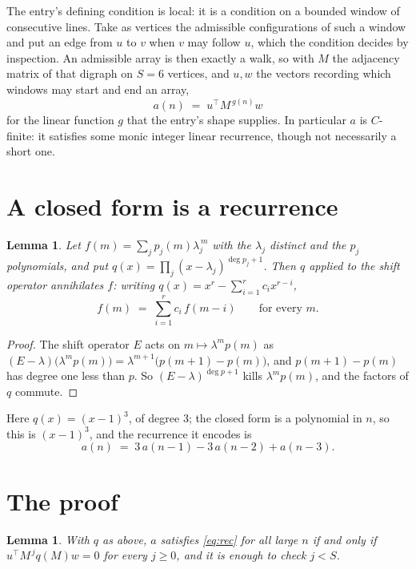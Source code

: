 \documentclass[11pt,a4paper]{article}
\theoremstyle{plain}
\newtheorem{lemma}[theorem]{Lemma}
\theoremstyle{definition}
\begin{document}
The entry's defining condition is local: it is a condition on a bounded window of consecutive lines. Take as vertices the
admissible configurations of such a window and put an edge from $u$ to $v$ when $v$ may
follow $u$, which the condition decides by inspection. An admissible array is then exactly a
walk, so with $M$ the adjacency matrix of that digraph on $S=6$ vertices, and $u,w$ the
vectors recording which windows may start and end an array,
\[
a(n)\;=\;u^{\!\top}M^{\,g(n)}w
\]
for the linear function $g$ that the entry's shape supplies. In particular $a$ is
$C$-finite: it satisfies some monic integer linear recurrence, though not necessarily a short
one.

\section{A closed form is a recurrence}

\begin{lemma}\label{lem:ann}
Let $f(m)=\sum_{j}p_j(m)\lambda_j^{\,m}$ with the $\lambda_j$ distinct and the $p_j$
polynomials, and put $q(x)=\prod_j(x-\lambda_j)^{\deg p_j+1}$. Then $q$ applied to the shift
operator annihilates $f$: writing $q(x)=x^{r}-\sum_{i=1}^{r}c_ix^{r-i}$,
\[
f(m)\;=\;\sum_{i=1}^{r}c_i\,f(m-i)\qquad\text{for every }m.
\]
\end{lemma}

\begin{proof}
The shift operator $E$ acts on $m\mapsto\lambda^{m}p(m)$ as
$(E-\lambda)\bigl(\lambda^{m}p(m)\bigr)=\lambda^{m+1}\bigl(p(m+1)-p(m)\bigr)$, and
$p(m+1)-p(m)$ has degree one less than $p$. So $(E-\lambda)^{\deg p+1}$ kills
$\lambda^{m}p(m)$, and the factors of $q$ commute.
\end{proof}

Here $q(x)=(x-1)^{3}$, of degree $3$; the closed form is a polynomial in $n$, so this is $(x-1)^{3}$, and the recurrence it encodes is
\begin{equation}\label{eq:rec}
a(n)\;=\;3\,a(n-1) - 3\,a(n-2) + a(n-3).
\end{equation}

\section{The proof}

\begin{lemma}\label{lem:crit}
With $q$ as above, $a$ satisfies \eqref{eq:rec} for all large $n$ if and only if
$u^{\!\top}M^{\,j}q(M)w=0$ for every $j\ge0$, and it is enough to check $j<S$.
\end{lemma}
\end{document}
